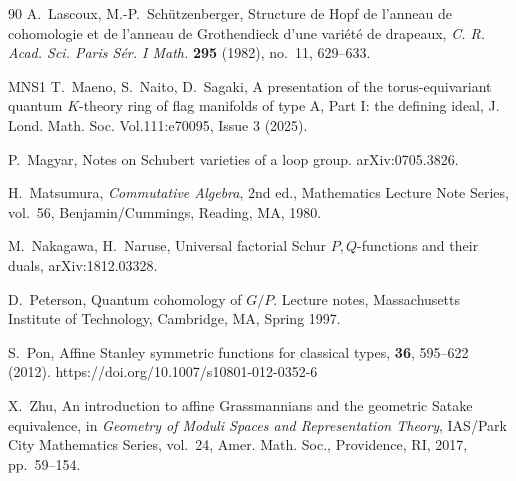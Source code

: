 \documentclass[a4paper]{amsart}
\theoremstyle{remark}
\numberwithin{equation}{section}
\begin{document}
\begin{thebibliography}{90}
A.~Lascoux, M.-P.~Sch\"utzenberger,
Structure de Hopf de l'anneau de cohomologie et de l'anneau de Grothendieck d'une vari\'et\'e de drapeaux,
\emph{C. R. Acad. Sci. Paris S\'er. I Math.} \textbf{295} (1982), no.~11, 629--633.




\bibitem%
{MNS1}
T.~Maeno, S.~Naito, D.~Sagaki, 
A presentation of the torus-equivariant quantum $K$-theory ring of flag manifolds of type A, Part I: the defining ideal, 
J. Lond. Math. Soc. Vol.111:e70095, Issue 3 (2025).


 P.~Magyar, Notes on Schubert varieties of a loop group. arXiv:0705.3826.

H.~Matsumura,
\textit{Commutative Algebra},
2nd ed., Mathematics Lecture Note Series, vol.~56,
Benjamin/Cummings, Reading, MA, 1980.

M.~Nakagawa, H.~Naruse,
Universal factorial Schur $P,Q$-functions and their duals,
arXiv:1812.03328.

 D.~Peterson, Quantum cohomology of $G/P$. Lecture notes, Massachusetts Institute of Technology, Cambridge, MA, Spring 1997. 

S.~Pon,
\newblock Affine Stanley symmetric functions for classical types,
 {\bf 36}, 595–622 (2012). https://doi.org/10.1007/s10801-012-0352-6




X.~Zhu,
\newblock An introduction to affine {G}rassmannians and the geometric
{S}atake equivalence,
\newblock in \emph{Geometry of Moduli Spaces and Representation Theory},
IAS/Park City Mathematics Series, vol.~24,
Amer. Math. Soc., Providence, RI, 2017, pp.~59--154.
\end{thebibliography}
\end{document}
